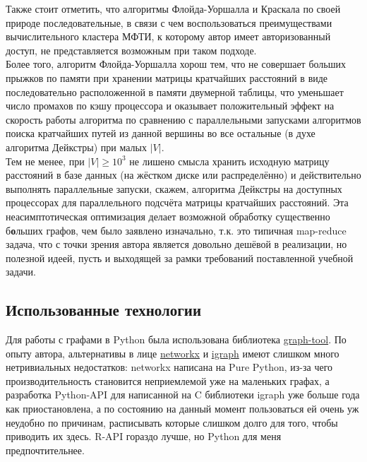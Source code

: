 \documentclass[11pt,a4paper]{report}
\def\ge{\geqslant}
\theoremstyle{definition}
\theoremstyle{definition}
\theoremstyle{definition}
\begin{document}
	\noindent Также стоит отметить, что алгоритмы Флойда-Уоршалла и Краскала по своей природе последовательные, в связи с чем воспользоваться преимуществами вычислительного кластера МФТИ, к которому автор имеет авторизованный доступ, не представляется возможным при таком подходе.\\
	
	\noindent Более того, алгоритм Флойда-Уоршалла хорош тем, что не совершает больших прыжков по памяти при хранении матрицы кратчайших расстояний в виде последовательно расположенной в памяти двумерной таблицы, что уменьшает число промахов по кэшу процессора и оказывает положительный эффект на скорость работы алгоритма по сравнению с параллельными запусками алгоритмов поиска кратчайших путей из данной вершины во все остальные (в духе алгоритма Дейкстры) при малых $|V|$.\\
	
	\noindent Тем не менее, при $|V| \ge 10^3$ не лишено смысла хранить исходную матрицу расстояний в базе данных (на жёстком диске или распределённо) и действительно выполнять параллельные запуски, скажем, алгоритма Дейкстры на доступных процессорах для параллельного подсчёта матрицы кратчайших расстояний. Эта неасимптотическая оптимизация делает возможной обработку существенно б\textbf{о}льших графов, чем было заявлено изначально, т.к. это типичная map-reduce задача, что с точки зрения автора является довольно дешёвой в реализации, но полезной идеей, пусть и выходящей за рамки требований поставленной учебной задачи. 
	
	\subsection{Использованные технологии}
			Для работы с графами в Python была использована библиотека \href{https://graph-tool.skewed.de/static/doc/topology.html#graph_tool.topology.shortest_distance}{graph-tool}. По опыту автора, альтернативы в лице \href{https://networkx.github.io/}{networkx} и \href{https://igraph.org/python/}{igraph} имеют слишком много нетривиальных недостатков: networkx написана на Pure Python, из-за чего производительность становится неприемлемой уже на маленьких графах, а разработка Python-API для написанной на C библиотеки igraph уже больше года как приостановлена, а по состоянию на данный момент пользоваться ей очень уж неудобно по причинам, расписывать которые слишком долго для того, чтобы приводить их здесь. R-API гораздо лучше, но Python для меня предпочтительнее.
\end{document}
